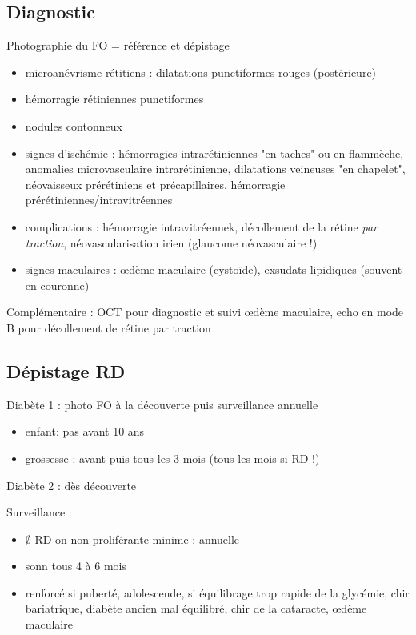 \documentclass[11pt]{article}
\begin{document}
\subsection{Diagnostic}
\label{sec:orgaa03d26}
Photographie du FO = référence et dépistage
\begin{itemize}
\item microanévrisme rétitiens : dilatations punctiformes rouges (postérieure)
\item hémorragie rétiniennes punctiformes
\item nodules contonneux
\item signes d'ischémie : hémorragies intrarétiniennes "en taches" ou en flammèche, anomalies
microvasculaire intrarétinienne, dilatations veineuses "en chapelet",
néovaisseux prérétiniens et précapillaires, hémorragie prérétiniennes/intravitréennes
\item complications : hémorragie intravitréennek, décollement de la rétine \emph{par
traction}, néovascularisation irien (\thus glaucome néovasculaire !)
\item signes maculaires : \oe{}dème maculaire (cystoïde), exsudats lipidiques
(souvent en couronne)
\end{itemize}

Complémentaire : OCT pour diagnostic et suivi \oe{}dème maculaire, echo en mode B
pour décollement de rétine par traction

\subsection{Dépistage RD}
\label{sec:orgd894dfc}
Diabète 1 : photo FO à la découverte puis surveillance annuelle
\begin{itemize}
\item enfant: pas avant 10 ans
\item grossesse : avant puis tous les 3 mois (tous les mois si RD !)
\end{itemize}
Diabète 2 : dès découverte

Surveillance :
\begin{itemize}
\item \(\emptyset\) RD on non proliférante minime : annuelle
\item sonn tous 4 à 6 mois
\item renforcé si puberté, adolescende, si équilibrage trop rapide de la glycémie,
chir bariatrique, diabète ancien mal équilibré, chir de la cataracte,
\oe{}dème maculaire
\end{itemize}
\end{document}

